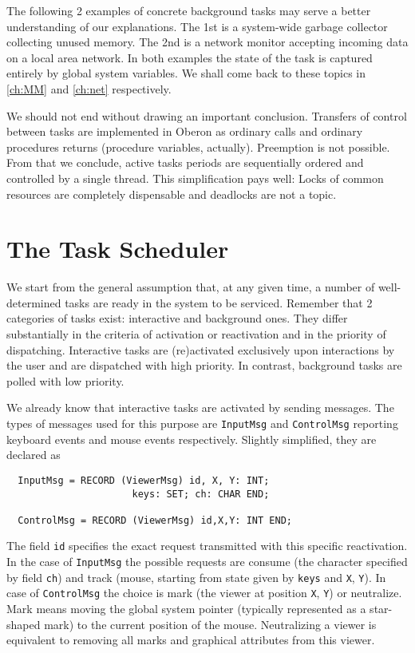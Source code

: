 The following 2 examples of concrete background tasks may serve a better understanding of
our explanations. The 1st is a system-wide garbage collector collecting unused memory.
The 2nd is a network monitor accepting incoming data on a local area network. In both
examples the state of the task is captured entirely by global system variables. We shall
come back to these topics in \ref{ch:MM} and \ref{ch:net} respectively.

We should not end without drawing an important conclusion. Transfers of control between tasks
are implemented in Oberon as ordinary calls and ordinary procedures returns (procedure
variables, actually). Preemption is not possible. From that we conclude, active tasks periods
are sequentially ordered and controlled by a single thread. This simplification pays well:
Locks of common resources are completely dispensable and deadlocks are not a topic.

\section{The Task Scheduler}
\label{sec:scheduler}
We start from the general assumption that, at any given time, a number of well-determined
tasks are ready in the system to be serviced. Remember that 2 categories of tasks exist:
interactive and background ones. They differ substantially in the criteria of activation
or reactivation and in the priority of dispatching. Interactive tasks are (re)activated
exclusively upon interactions by the user and are dispatched with high priority.
In contrast, background tasks are polled with low priority.

We already know that interactive tasks are activated by sending messages. The types of messages
used for this purpose are \verb|InputMsg| and \verb|ControlMsg| reporting keyboard events
and mouse events respectively. Slightly simplified, they are declared as
\begin{verbatim}
  InputMsg = RECORD (ViewerMsg) id, X, Y: INT;
                      keys: SET; ch: CHAR END;

  ControlMsg = RECORD (ViewerMsg) id,X,Y: INT END;
\end{verbatim}
The field \verb|id| specifies the exact request transmitted with this specific reactivation.
In the case of \verb|InputMsg| the possible requests are consume (the character specified
by field \verb|ch|) and track (mouse, starting from state given by \verb|keys| and \verb|X|,
\verb|Y|). In case of \verb|ControlMsg| the choice is mark (the viewer at position \verb|X|,
\verb|Y|) or neutralize. Mark means moving the global system pointer (typically represented
as a star-shaped mark) to the current position of the mouse. Neutralizing a viewer
is equivalent to removing all marks and graphical attributes from this viewer.

